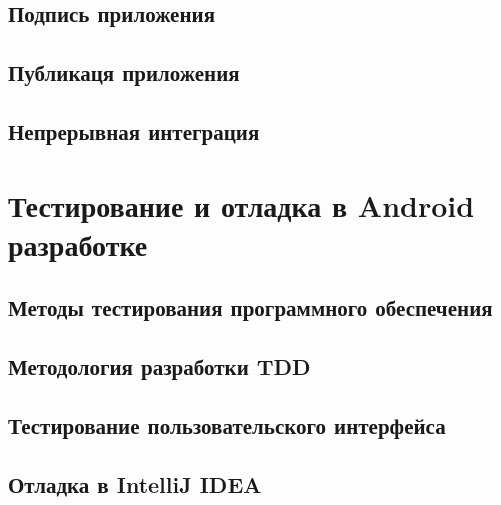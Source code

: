 \subsection{Подпись приложения}
\label{subsec:signing}

\subsection{Публикаця приложения}
\label{subsec:publish}

\subsection{Непрерывная интеграция}
\label{subsec:ci}


\section{Тестирование и отладка в Android разработке}
\label{sec:testing}

\subsection{Методы тестирования программного обеспечения}
\label{subsec:testing:methods}

\subsection{Методология разработки TDD}
\label{subsec:testing:tdd}

\subsection{Тестирование пользовательского интерфейса}
\label{subsec:testing:ui}

\subsection{Отладка в IntelliJ IDEA}
\label{subsec:debug}

\conclusions
\label{sec:techConclusions}
